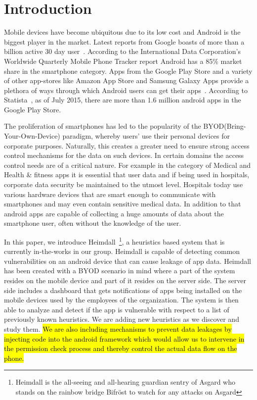 \section{Introduction}
\label{intro}
Mobile devices have become ubiquitous due to its low cost and Android is the biggest player in the market. Latest reports from Google boasts of more than a billion active 30 day user~\cite{Engadget_market_share}. According to the International Data Corporation's Worldwide Quarterly Mobile Phone Tracker report Android has a 85\% market share in the smartphone category. Apps from the Google Play Store and a variety of other app-stores like Amazon App Store and Samsung Galaxy Apps provide a plethora of ways through which Android users can get their apps~\cite{Online_App_Stores}. According to Statista~\cite{Android_app_number}, as of July 2015, there are more than 1.6 million android apps in the Google Play Store. 

The proliferation of smartphones has led to the popularity of the BYOD(Bring-Your-Own-Device) paradigm, whereby users' use their personal devices for corporate purposes. Naturally, this creates a greater need to ensure strong access control mechanisms for the data on such devices. In certain domains the access control needs are of a critical nature. For example in the category of Medical and Health \& fitness apps it is essential that user data and if being used in hospitals, corporate data security be maintained to the utmost level. Hospitals today use various hardware devices that are smart enough to communicate with smartphones and may even contain sensitive medical data. In addition to that android apps are capable of collecting a huge amounts of data about the smartphone user, often without the knowledge of the user. 

In this paper, we introduce Heimdall~\footnote{Heimdall is the all-seeing and all-hearing guardian sentry of Asgard who stands on the rainbow bridge Bifr\"{o}st to watch for any attacks on Asgard}, a heuristics based system that is currently in-the-works in our group. Heimdall is capable of detecting common vulnerabilities on an android device that can cause leakage of app data. Heimdall has been created with a BYOD scenario in mind where a part of the system resides on the mobile device and part of it resides on the server side. The server side includes a dashboard that gets notifications of apps being installed on the mobile devices used by the employees of the organization. The system is then able to analyze and detect if the app is vulnerable with respect to a list of previously known heuristics. We are adding new heuristics as we discover and study them. \hl{We are also including mechanisms to prevent data leakages by injecting code into the android framework which would allow us to intervene in the permission check process and thereby control the actual data flow on the phone.}

